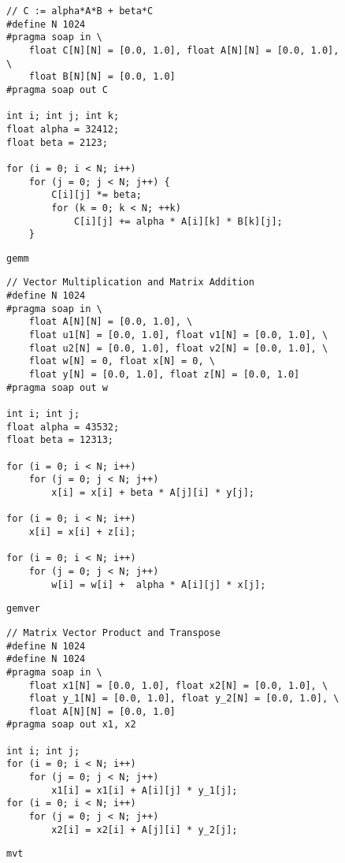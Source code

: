 \begin{figure}[ht]
\begin{lstlisting}
// C := alpha*A*B + beta*C
#define N 1024
#pragma soap in \
    float C[N][N] = [0.0, 1.0], float A[N][N] = [0.0, 1.0], \
    float B[N][N] = [0.0, 1.0]
#pragma soap out C

int i; int j; int k;
float alpha = 32412;
float beta = 2123;

for (i = 0; i < N; i++)
    for (j = 0; j < N; j++) {
        C[i][j] *= beta;
        for (k = 0; k < N; ++k)
            C[i][j] += alpha * A[i][k] * B[k][j];
    }
\end{lstlisting}
\caption{\texttt{gemm}}
\end{figure}


\begin{figure}[ht]
\begin{lstlisting}
// Vector Multiplication and Matrix Addition
#define N 1024
#pragma soap in \
    float A[N][N] = [0.0, 1.0], \
    float u1[N] = [0.0, 1.0], float v1[N] = [0.0, 1.0], \
    float u2[N] = [0.0, 1.0], float v2[N] = [0.0, 1.0], \
    float w[N] = 0, float x[N] = 0, \
    float y[N] = [0.0, 1.0], float z[N] = [0.0, 1.0]
#pragma soap out w

int i; int j;
float alpha = 43532;
float beta = 12313;

for (i = 0; i < N; i++)
    for (j = 0; j < N; j++)
        x[i] = x[i] + beta * A[j][i] * y[j];

for (i = 0; i < N; i++)
    x[i] = x[i] + z[i];

for (i = 0; i < N; i++)
    for (j = 0; j < N; j++)
        w[i] = w[i] +  alpha * A[i][j] * x[j];
\end{lstlisting}
\caption{\texttt{gemver}}
\end{figure}


\begin{figure}[ht]
\begin{lstlisting}
// Matrix Vector Product and Transpose
#define N 1024
#define N 1024
#pragma soap in \
    float x1[N] = [0.0, 1.0], float x2[N] = [0.0, 1.0], \
    float y_1[N] = [0.0, 1.0], float y_2[N] = [0.0, 1.0], \
    float A[N][N] = [0.0, 1.0]
#pragma soap out x1, x2

int i; int j;
for (i = 0; i < N; i++)
    for (j = 0; j < N; j++)
        x1[i] = x1[i] + A[i][j] * y_1[j];
for (i = 0; i < N; i++)
    for (j = 0; j < N; j++)
        x2[i] = x2[i] + A[j][i] * y_2[j];
\end{lstlisting}
\caption{\texttt{mvt}}
\end{figure}


